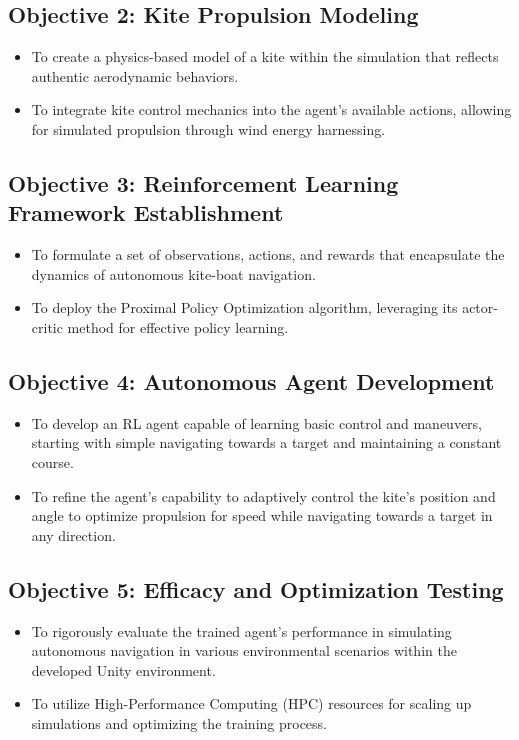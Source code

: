 \subsection*{Objective 2: Kite Propulsion Modeling}
\begin{itemize}
    \item To create a physics-based model of a kite within the simulation that reflects authentic aerodynamic behaviors.
    \item To integrate kite control mechanics into the agent’s available actions, allowing for simulated propulsion through wind energy harnessing.
\end{itemize}

\subsection*{Objective 3: Reinforcement Learning Framework Establishment}
\begin{itemize}
    \item To formulate a set of observations, actions, and rewards that encapsulate the dynamics of autonomous kite-boat navigation.
    \item To deploy the Proximal Policy Optimization algorithm, leveraging its actor-critic method for effective policy learning.
\end{itemize}

\subsection*{Objective 4: Autonomous Agent Development}
\begin{itemize}
    \item To develop an RL agent capable of learning basic control and maneuvers, starting with simple navigating towards a target and maintaining a constant course.
    \item To refine the agent's capability to adaptively control the kite's position and angle to optimize propulsion for speed while navigating towards a target in any direction.
\end{itemize}

\subsection*{Objective 5: Efficacy and Optimization Testing}
\begin{itemize}
    \item To rigorously evaluate the trained agent’s performance in simulating autonomous navigation in various environmental scenarios within the developed Unity environment.
    \item To utilize High-Performance Computing (HPC) resources for scaling up simulations and optimizing the training process.
\end{itemize}

